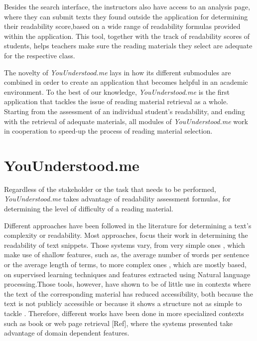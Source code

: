 \documentclass{sig-alternate-05-2015}
\begin{document}

Besides the search interface, the instructors also have access to an analysis page, where they can submit texts they found outside the application for determining their readability score,based on a wide range of readability formulas provided within the application. This tool, together with the track of readability scores of students, helps teachers make sure the reading materials they select are adequate for the respective class.

The novelty of \textit{YouUnderstood.me} lays in how its different submodules are combined in order to create an application that becomes helpful in an academic environment. To the best of our knowledge, \textit{YouUnderstood.me} is the first application that tackles the issue of reading material retrieval as a whole. Starting from the assessment of an individual student's readability, and ending with the retrieval of adequate materials, all modules of \textit{YouUnderstood.me} work in cooperation to speed-up the process of reading material selection.

 

\section{YouUnderstood.me}



Regardless of the stakeholder or the task that needs to be performed, \textit{YouUnderstood.me}
takes advantage of readability assessment formulas, for determining the level of difficulty of a reading material.


Different approaches have been followed in the literature for determining a text's complexity or readability. Most approaches, focus their work in determining the readability of text snippets. Those systems vary, from very simple ones \cite{flesch1948new}, which make use of shallow features, such as, the average number of words per sentence or the average length of terms, to more complex ones \cite{gonzalez2014simple}\cite{dell2011read} \cite{franccois2012ai}, which are mostly based, on supervised learning techniques and features extracted using Natural language processing.Those tools, however,  have shown to be of little use in contexts where the text of the corresponding material has reduced accessibility, both because the text is not publicly accessible or because it shows a structure  not as simple to tackle . Therefore, different works have been done in more specialized contexts such as book \cite{denning2015readability}\cite{pera2014automating} or web page retrieval [Ref], where the systems presented take advantage of domain dependent features.
\end{document}
